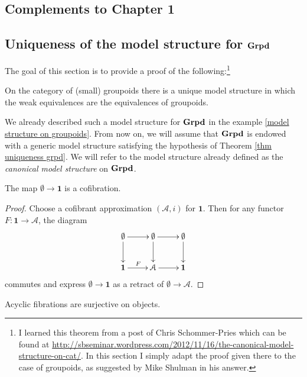 \begin{refsection}
\section{Complements to Chapter 1}

\subsection{Uniqueness of the model structure for $\mathbf{Grpd}$}

The goal of this section is to provide a proof of the following:\footnote{I learned this theorem from a post of Chris Schommer-Pries which can be found at \url{http://sbseminar.wordpress.com/2012/11/16/the-canonical-model-structure-on-cat/}. In this section I simply adapt the proof given there to the case of groupoids, as suggested by Mike Shulman in his answer.}

\begin{thm} \label{thm uniqueness grpd}
On the category of (small) groupoids there is a unique model structure in which the weak equivalences are the equivalences of groupoids.
\end{thm}

We already described such a model structure for $\mathbf{Grpd}$ in the example \ref{model structure on groupoids}. From now on, we will assume that $\mathbf{Grpd}$ is endowed with a generic model structure satisfying the hypothesis of Theorem \ref{thm uniqueness grpd}. We will refer to the model structure already defined as the \emph{canonical model structure} on $\mathbf{Grpd}$.

\begin{lemma} \label{lemma uniqueness 1}
The map $\emptyset \to \mathbf 1$ is a cofibration.
\end{lemma}

\begin{proof}
Choose a cofibrant approximation $(\mathcal A,i)$ for $\mathbf 1$. Then for any functor $F \colon \mathbf 1 \to \mathcal A$, the diagram
\[
\xymatrix{
\emptyset \ar[d] \ar[r] & \emptyset \ar[d] \ar[r] & \emptyset \ar[d] \\
\mathbf 1 \ar[r]^F & \mathcal A \ar[r] & \mathbf 1
}
\]
commutes and express $\emptyset \to \mathbf 1$ as a retract of $\emptyset \to \mathcal A$.
\end{proof}

\begin{cor} \label{cor uniqueness 2}
Acyclic fibrations are surjective on objects.
\end{cor}


\end{refsection}
